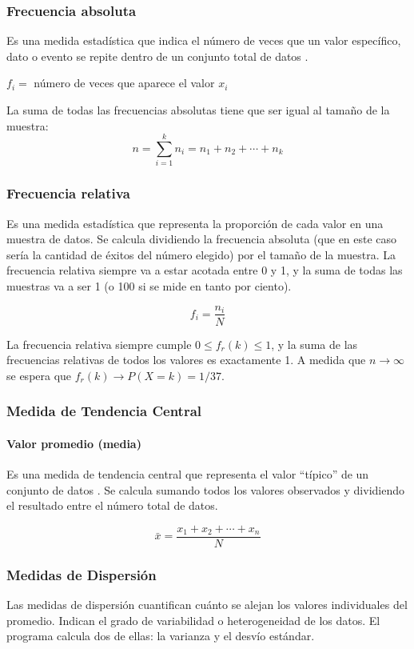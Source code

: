 \documentclass{article}
\begin{document}
\subsubsection{Frecuencia absoluta}
Es una medida estadística que indica el número de veces que un valor específico, dato o evento se repite dentro de un 
conjunto total de datos \cite{frecuencia_absoluta_economipedia}.

\begin{center}
$f_i =$ número de veces que aparece el valor $x_i$
\end{center}

La suma de todas las frecuencias absolutas tiene que ser igual al tamaño de la muestra:
$$n=\sum_{i=1}^{k} n_i = n_1 + n_2 + \cdots + n_k$$

\subsubsection{Frecuencia relativa}
Es una medida estadística que representa la proporción de cada valor en una muestra de datos. Se calcula dividiendo la 
frecuencia absoluta (que en este caso sería la cantidad de éxitos del número elegido) por el tamaño de la muestra. 
La frecuencia relativa siempre va a estar acotada entre 0 y 1, y la suma de todas las muestras va a ser 1 (o 100 si se 
mide en tanto por ciento).

$$f_i = \frac{n_i}{N}$$

La frecuencia relativa siempre cumple $0 \leq f_r(k) \leq 1$, y la suma de las frecuencias relativas de todos los valores 
es exactamente 1. A medida que $n \to \infty$ se espera que $f_r(k) \to P(X = k) = 1/37$.

\subsubsection{Medida de Tendencia Central}

\paragraph{Valor promedio (media)}
Es una medida de tendencia central que representa el valor ``típico'' de un conjunto de datos \cite{promedio_economipedia}. Se calcula sumando todos 
los valores observados y dividiendo el resultado entre el número total de datos.

$$\bar{x} = \frac{x_1 + x_2 + \cdots + x_n}{N}$$

\subsubsection{Medidas de Dispersión}
Las medidas de dispersión cuantifican cuánto se alejan los valores individuales del promedio. Indican el grado de 
variabilidad o heterogeneidad de los datos. El programa calcula dos de ellas: la varianza y el desvío estándar.
\end{document}

